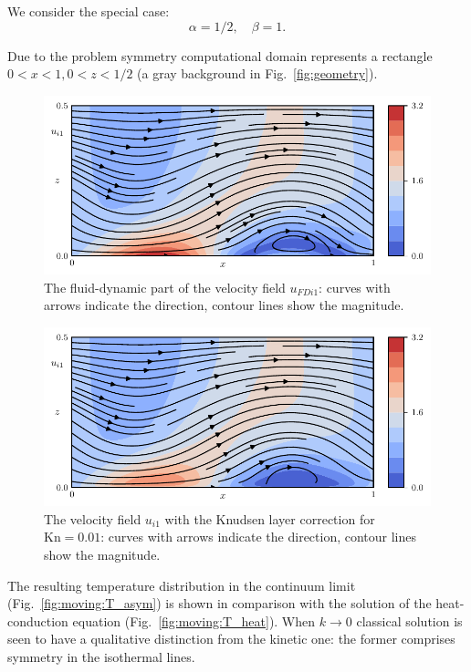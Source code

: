 \documentclass[smallextended, referee]{svjour3} %
\newcommand{\Kn}{\mathrm{Kn}}
\begin{document}
We consider the special case:
\[ \alpha=1/2, \quad \beta = 1. \]

Due to the problem symmetry computational domain represents a rectangle \(0<x<1, 0<z<1/2\)
(a gray background in Fig.~\ref{fig:geometry}).

\begin{figure}
	\centering
	\includegraphics{Fig5}
	\caption{The fluid-dynamic part of the velocity field \(u_{FDi1}\):
		curves with arrows indicate the direction, contour lines show the magnitude.}
	\label{fig:moving:fluid}
\end{figure}

\begin{figure}
	\centering
	\includegraphics{Fig6}
	\caption{The velocity field \(u_{i1}\) with the Knudsen layer correction for \(\Kn=0.01\):
		curves with arrows indicate the direction, contour lines show the magnitude.}
	\label{fig:moving:kn001}
\end{figure}

The resulting temperature distribution in the continuum limit (Fig.~\ref{fig:moving:T_asym}) is shown
in comparison with the solution of the heat-conduction equation (Fig.~\ref{fig:moving:T_heat}).
When \(k\to0\) classical solution is seen to have a qualitative distinction from the kinetic one: 
the former comprises symmetry in the isothermal lines.
\end{document}
